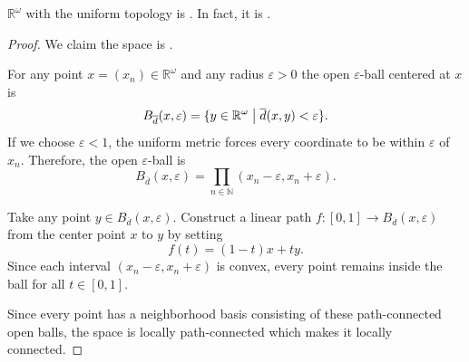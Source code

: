 \documentclass[11pt]{article}
\begin{document}
\begin{prop}\label{prop:omega_uniform_local_connectedness}
    $\mathbb R^\omega$ with the uniform topology 
    is . 
    In fact, it is . 
\end{prop}
\begin{proof}
    We claim the space is 
    . 

    For any point $x = (x_n) \in \mathbb R^\omega$ 
    and any radius $\varepsilon > 0$ the open $\varepsilon$-ball 
    centered at $x$ is 
    \[
        B_{\overline d}(x,\varepsilon)=\{y \in \mathbb R^\omega 
        \bigm| \overline d(x,y) < \varepsilon\}. 
    \]
    If we choose $\varepsilon < 1$, the uniform metric 
    forces every coordinate to be within 
    $\varepsilon$ of $x_n$. 
    Therefore, the open $\varepsilon$-ball 
    is 
    \[
        B_{\overline d}(x,\varepsilon) = 
        \prod_{n\in\mathbb N} (x_n - \varepsilon, 
        x_n + \varepsilon). 
    \]

    Take any point $y \in B_{\overline d}(x,\varepsilon)$. 
    Construct a linear path 
    $f : [0,1] \to B_{\overline d}(x,\varepsilon)$ 
    from the center point $x$ to $y$ by setting 
    \[
        f(t) = (1-t)x+ty. 
    \]
    Since each interval $(x_n - \varepsilon, 
    x_n + \varepsilon)$ is convex, 
    every point remains inside the ball 
    for all $t \in [0,1]$. 

    Since every point has a neighborhood basis 
    consisting of these path-connected open balls, 
    the space is locally path-connected which makes 
    it locally connected. 

\end{proof}
\end{document}
